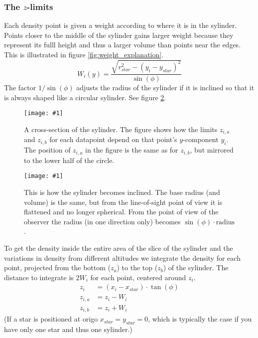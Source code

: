 \documentclass[a4paper, 12pt, english, titlepage]{article}
\newcommand{\bilde}[3]{
    \begin{figure}[htbp]
        \centering
        \texttt{[image: \#1]}
        \caption{#3 \label{#2}}
    \end{figure}
}
\begin{document}
    \subsubsection{The $z$-limits}
        \label{sec:z-limits}

        Each density point is given a weight according to where it is in the sylinder. Points closer to the middle of the sylinder gains larger weight because they represent its fulll height and thus a larger volume than points near the edges. This is illustrated in figure \vref{fig:weight_explanation}.
        $$
        W_i(y) = \frac{\sqrt{r_{star}^2 - (y_i - y_{star})^2}}{\sin(\phi)}
        $$
        The factor $1/\sin(\phi)$ adjusts the radius of the sylinder if it is inclined so that it is always shaped like a circular sylinder. See figure \ref{fig:sylinder_inclined}.
        \bilde{figures/weight_explanation}{fig:weight_explanation}
        {A cross-section of the sylinder. The figure shows how the limits $z_{i,a}$ and $z_{i,b}$ for each datapoint depend on that point's $y$-component $y_i$. The position of $z_{i,a}$ in the figure is the same as for $z_{i,b}$, but mirrored to the lower half of the circle.}
        \bilde{figures/sylinder_inclined}{fig:sylinder_inclined}
        {This is how the sylinder becomes inclined. The base radius (and volume) is the same, but from the line-of-sight point of view it is flattened and no longer spherical. From the point of view of the observer the radius (in one direction only) becomes $\sin(\phi)\cdot\textrm{radius}$.}

        To get the density inside the entire area of the slice of the sylinder and the variations in density from different altitudes we integrate the density for each point, projected from the bottom ($z_a$) to the top ($z_b$) of the sylinder. The distance to integrate is $2W_i$ for each point, centered around $z_i$.
        \begin{align*}
            z_i &= (x_i - x_{star}) \cdot \tan(\phi) \\
            z_{i,a} &= z_i - W_i \\
            z_{i,b} &= z_i + W_i
        \end{align*}
        (If a star is positioned at origo $x_{star} = y_{star} = 0$, which is typically the case if you have only one star and thus one sylinder.)
\end{document}
